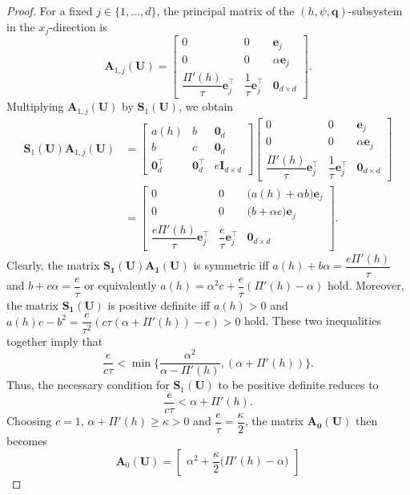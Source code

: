 \documentclass[11pt]{article}
\numberwithin{equation}{section}
\newtheorem{counter example}[theorem]{Counter Example}
\numberwithin{equation}{section}
\numberwithin{equation}{section}
\begin{document}
\begin{proof}
For a fixed $j\in\{1,\ldots,d\}$, the principal matrix of the
$(h,\psi,\mathbf q)$-subsystem in the $x_j$-direction is
\[
\mathbf A_{1,j}(\mathbf U)
=
\begin{bmatrix}
0&0&\mathbf e_j\\
0&0&\alpha\mathbf e_j\\
\dfrac{\Pi'(h)}{\tau}\mathbf e_j^\top&
\dfrac1\tau\mathbf e_j^\top&
\mathbf 0_{d\times d}
\end{bmatrix}.
\]
Multiplying $\mathbf A_{1,j}(\mathbf U)$ by
$\mathbf S_1(\mathbf U)$, we obtain
\begin{align*}
\mathbf S_1(\mathbf U)\mathbf A_{1,j}(\mathbf U)
&=
\begin{bmatrix}
a(h)&b&\mathbf 0_d\\
b&c&\mathbf 0_d\\
\mathbf 0_d^\top&\mathbf 0_d^\top&
e\mathbf I_{d\times d}
\end{bmatrix}
\begin{bmatrix}
0&0&\mathbf e_j\\
0&0&\alpha\mathbf e_j\\
\dfrac{\Pi'(h)}{\tau}\mathbf e_j^\top&
\dfrac1\tau\mathbf e_j^\top&
\mathbf 0_{d\times d}
\end{bmatrix}
\\
&=
\begin{bmatrix}
0&0&\bigl(a(h)+\alpha b\bigr)\mathbf e_j\\
0&0&\bigl(b+\alpha c\bigr)\mathbf e_j\\
\dfrac{e\Pi'(h)}{\tau}\mathbf e_j^\top&
\dfrac e\tau\mathbf e_j^\top&
\mathbf 0_{d\times d}
\end{bmatrix}.
\end{align*}
Clearly, the matrix $\mathbf{S_1(U)}\mathbf{A_1(U)}$ is symmetric iff $a(h)+b\alpha=\dfrac{e\Pi'(h)}{\tau}$ and $b+c\alpha=\dfrac{e}{\tau}$ or equivalently $a(h)=\alpha^2 c+\dfrac{e}{\tau}(\Pi'(h)-\alpha)$ hold. Moreover, the matrix $\mathbf{S_1(U)}$ is positive definite iff $a(h)>0$ and $a(h)c-b^2=\dfrac{e}{\tau^2}(c\tau(\alpha+\Pi'(h))-e)>0$ hold. These two inequalities together imply that
\[
\dfrac{e}{c\tau}<\min\bigg\{\dfrac{\alpha^2}{\alpha-\Pi'(h)}, (\alpha+\Pi'(h))\bigg\}.
\]
Thus, the necessary condition for $\mathbf{S}_1(\mathbf{U})$ to be positive definite reduces to
\[
\dfrac{e}{c\tau}<\alpha+\Pi'(h).
\]
Choosing $c=1$, $\alpha+\Pi'(h)\geq \kappa>0$ and $\dfrac{e}{\tau}=\dfrac{\kappa}{2}$, the matrix $\mathbf{A_0(U)}$ then becomes
\[
\mathbf A_0(\mathbf U)
=
\begin{bmatrix}
\alpha^2+\dfrac{\kappa}{2}\bigl(\Pi'(h)-\alpha\bigr)

\end{bmatrix}\]
\end{proof}
\end{document}
